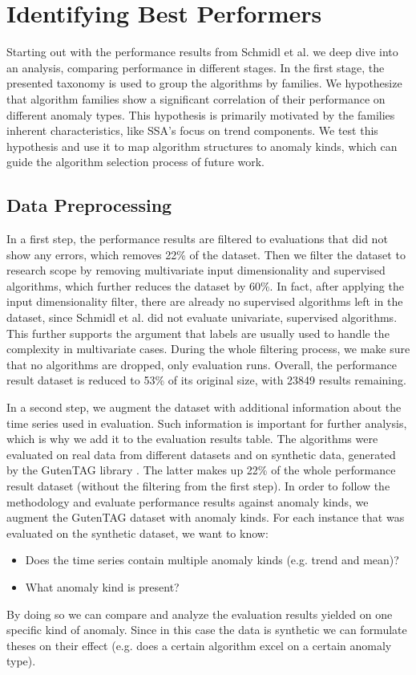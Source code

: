 \chapter{Identifying Best Performers}
\label{ch:identifying_best_performers}
Starting out with the performance results from Schmidl et al. \cite{Schmidl2022} we deep dive into an analysis, comparing performance in different stages. In the first stage, the presented taxonomy is used to group the algorithms by families. We hypothesize that algorithm families show a significant correlation of their performance on different anomaly types. This hypothesis is primarily motivated by the families inherent characteristics, like SSA's focus on trend components. We test this hypothesis and use it to map algorithm structures to anomaly kinds, which can guide the algorithm selection process of future work. 

\section{Data Preprocessing}
In a first step, the performance results are filtered to evaluations that did not show any errors, which removes 22\% of the dataset.
Then we filter the dataset to research scope by removing multivariate input dimensionality and supervised algorithms, which further reduces the dataset by 60\%. In fact, after applying the input dimensionality filter, there are already no supervised algorithms left in the dataset, since Schmidl et al. \cite{Schmidl2022} did not evaluate univariate, supervised algorithms. This further supports the argument that labels are usually used to handle the complexity in multivariate cases.
During the whole filtering process, we make sure that no algorithms are dropped, only evaluation runs. Overall, the performance result dataset is reduced to 53\% of its original size, with 23849 results remaining.

In a second step, we augment the dataset with additional information about the time series used in evaluation. Such information is important for further analysis, which is why we add it to the evaluation results table. The algorithms were evaluated on real data from different datasets and on synthetic data, generated by the GutenTAG library \cite{Wenig2022}. The latter makes up 22\% of the whole performance result dataset (without the filtering from the first step). In order to follow the methodology and evaluate performance results against anomaly kinds, we augment the GutenTAG dataset with anomaly kinds. For each instance that was evaluated on the synthetic dataset, we want to know:
\begin{itemize}
    \item Does the time series contain multiple anomaly kinds (e.g. trend and mean)?
    \item What anomaly kind is present?
\end{itemize}
By doing so we can compare and analyze the evaluation results yielded on one specific kind of anomaly. Since in this case the data is synthetic we can formulate theses on their effect (e.g. does a certain algorithm excel on a certain anomaly type).

